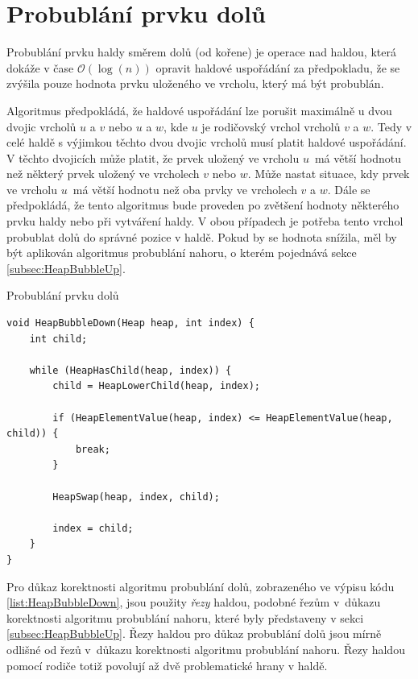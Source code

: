 \section{Probublání prvku dolů}
\label{subsec:HeapBubbleDown}

Probublání prvku haldy směrem dolů (od kořene) je operace nad haldou, která dokáže v čase $\mathcal{O}(\log(n))$ opravit haldové uspořádání za předpokladu, že se zvýšila pouze hodnota prvku uloženého ve vrcholu, který má být probublán.

Algoritmus předpokládá, že haldové uspořádání lze porušit maximálně u dvou dvojic vrcholů $u$ a $v$ nebo $u$ a $w$, kde $u$ je rodičovský vrchol vrcholů $v$ a $w$. Tedy v celé haldě s výjimkou těchto dvou dvojic vrcholů musí platit haldové uspořádání. V těchto dvojicích může platit, že prvek uložený ve vrcholu $u$~má větší hodnotu než některý prvek uložený ve vrcholech $v$ nebo $w$. Může nastat situace, kdy prvek ve vrcholu $u$~má větší hodnotu než oba prvky ve vrcholech $v$ a $w$. Dále se předpokládá, že tento algoritmus bude proveden po zvětšení hodnoty některého prvku haldy nebo při vytváření haldy. V obou případech je potřeba tento vrchol probublat dolů do správné pozice v haldě. Pokud by se hodnota snížila, měl by být aplikován algoritmus probublání nahoru, o kterém pojednává sekce \ref{subsec:HeapBubbleUp}.


\begin{listing}[H]
	\caption{Probublání prvku dolů}
	\label{list:HeapBubbleDown}
	\begin{verbatim}
void HeapBubbleDown(Heap heap, int index) {
    int child;

    while (HeapHasChild(heap, index)) {
        child = HeapLowerChild(heap, index);

        if (HeapElementValue(heap, index) <= HeapElementValue(heap, child)) {
            break;
        }

        HeapSwap(heap, index, child);

        index = child;
    }
}
	\end{verbatim}
\end{listing}

Pro důkaz korektnosti algoritmu probublání dolů, zobrazeného ve výpisu kódu \ref{list:HeapBubbleDown}, jsou použity \textit{řezy} haldou, podobné řezům v~důkazu korektnosti algoritmu probublání nahoru, které byly představeny v sekci \ref{subsec:HeapBubbleUp}. Řezy haldou pro důkaz probublání dolů jsou mírně odlišné od řezů v~důkazu korektnosti algoritmu probublání nahoru. Řezy haldou pomocí rodiče totiž povolují až dvě problematické hrany v haldě.

